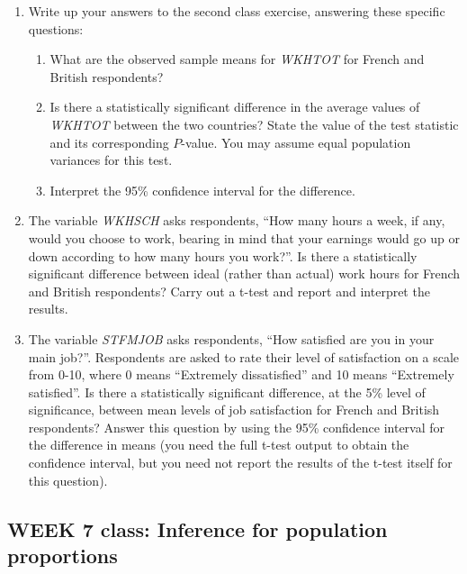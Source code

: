\documentclass[11pt,a4paper,openany]{book}
\begin{document}
\begin{enumerate}
\def\labelenumi{\arabic{enumi}.}
\item
  Write up your answers to the second class exercise, answering these
  specific questions:

  \begin{enumerate}
  \def\labelenumii{\arabic{enumii}.}
  \item
    What are the observed sample means for \emph{WKHTOT} for French and
    British respondents?
  \item
    Is there a statistically significant difference in the average
    values of \emph{WKHTOT} between the two countries? State the value
    of the test statistic and its corresponding \(P\)-value. You may
    assume equal population variances for this test.
  \item
    Interpret the 95\% confidence interval for the difference.
  \end{enumerate}
\item
  The variable \emph{WKHSCH} asks respondents, ``How many hours a week,
  if any, would you choose to work, bearing in mind that your earnings
  would go up or down according to how many hours you work?''. Is there
  a statistically significant difference between ideal (rather than
  actual) work hours for French and British respondents? Carry out a
  t-test and report and interpret the results.
\item
  The variable \emph{STFMJOB} asks respondents, ``How satisfied are you
  in your main job?''. Respondents are asked to rate their level of
  satisfaction on a scale from 0-10, where 0 means ``Extremely
  dissatisfied'' and 10 means ``Extremely satisfied''. Is there a
  statistically significant difference, at the 5\% level of
  significance, between mean levels of job satisfaction for French and
  British respondents? Answer this question by using the 95\% confidence
  interval for the difference in means (you need the full t-test output
  to obtain the confidence interval, but you need not report the results
  of the t-test itself for this question).
\end{enumerate}

\newpage

\subsection{WEEK 7 class: Inference for population
proportions}\label{week-7-class-inference-for-population-proportions}
\end{document}
